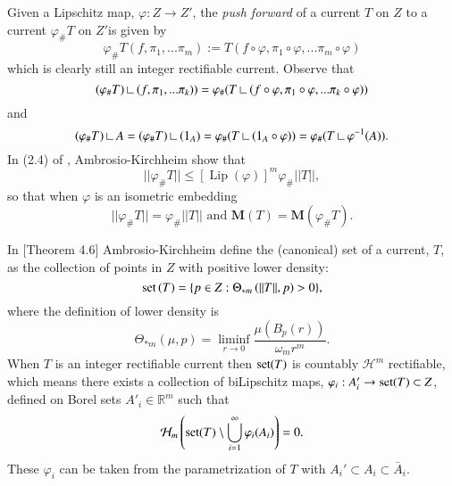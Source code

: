 \documentclass[12pt]{amsart}
\begin{document}
Given a Lipschitz map, $\varphi:Z\to Z'$, the {\em push
forward} of a current $T$ on $Z$ 
to a current $\varphi_\# T$ on $Z'$is given by
\begin{equation} \label{def-push-forward}
\varphi_\#T(f,\pi_1,...\pi_m):=T(f\circ \varphi, \pi_1\circ\varphi,...\pi_m\circ\varphi)
\end{equation}
which is clearly still an integer rectifiable current.
Observe that
\begin{equation}
(\varphi_\#T) {\:\mbox{\rule{0.1ex}{1.2ex}\rule{1.1ex}{0.1ex}}\:} (f, \pi_1,...\pi_k))= \varphi_\#(T {\:\mbox{\rule{0.1ex}{1.2ex}\rule{1.1ex}{0.1ex}}\:} (f\circ \varphi, \pi_1\circ\varphi,...\pi_k\circ\varphi) )
\end{equation}
and
\begin{equation} \label{rstr-push} 
(\varphi_\#T ){\:\mbox{\rule{0.1ex}{1.2ex}\rule{1.1ex}{0.1ex}}\:} A = (\varphi_\#T) {\:\mbox{\rule{0.1ex}{1.2ex}\rule{1.1ex}{0.1ex}}\:} ({{\bf \rm{1}}}_A)
=\varphi_\# (T {\:\mbox{\rule{0.1ex}{1.2ex}\rule{1.1ex}{0.1ex}}\:} ({{\bf \rm{1}}}_A\circ \varphi)) = \varphi_\#(T {\:\mbox{\rule{0.1ex}{1.2ex}\rule{1.1ex}{0.1ex}}\:} \varphi^{-1}(A)).
\end{equation}
In (2.4) of \cite{AK}, Ambrosio-Kirchheim show that
\begin{equation}  \label{mass-push}
||\varphi_\#T|| \le [{\operatorname{Lip}}(\varphi)]^m \varphi_\# ||T||,
\end{equation}
so that when $\varphi$ is an isometric
embedding 
\begin{equation} \label{lem-push-mass}
||\varphi_\#T||=\varphi_\#||T|| \textrm{ and }
{{\mathbf M}}(T)={{\mathbf M}}(\varphi_\#T).
\end{equation}

In \cite{AK}[Theorem 4.6] Ambrosio-Kirchheim define the (canonical) set of a current, $T$,
 as the collection of points in $Z$ with positive lower density:
\begin{equation} \label{def-set-current}
{{\rm{set}}}\left(T\right)= \{p \in Z: \Theta_{*m}\left( \|T\|, p\right) >0\},
\end{equation}
where the definition of lower density is
\begin{equation} \label{eqn-lower-density}
\Theta_{*m}\left( \mu, p\right) =\liminf_{r\to 0} \frac{\mu(B_p(r))}{\omega_m r^m}.
\end{equation}
When $T$ is an integer rectifiable current then ${{\rm{set}}}(T)$ is countably
$\mathcal{H}^m$ rectifiable, which means there exists a collection of
biLipschitz maps, $\varphi_i: A'_i \to {{\rm{set}}}(T) \subset Z$, defined on Borel sets
$A'_i \in \mathbb{R}^m$ such that
\begin{equation}
\mathcal{H}_m\left({{\rm{set}}}(T) \setminus \bigcup_{i=1}^\infty \varphi_i(A_i) \right)
=0.
\end{equation}
These $\varphi_i$ can be taken from the parametrization of $T$
with $A_i'\subset A_i \subset \bar{A}_i$.
\end{document}
